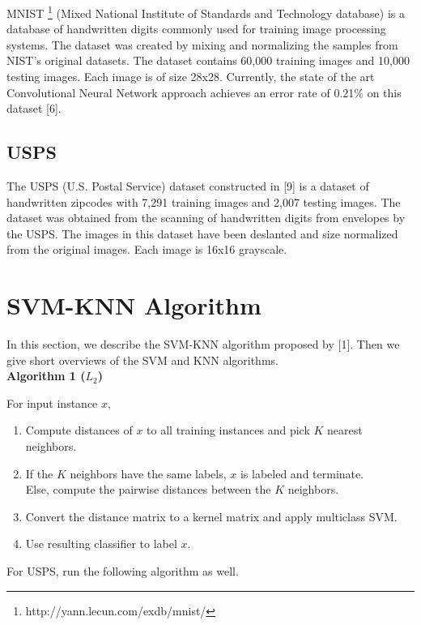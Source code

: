 \documentclass[11pt,letterpaper]{article}
\begin{document}
MNIST \footnote{http://yann.lecun.com/exdb/mnist/} (Mixed National Institute of Standards and Technology database) is a database of handwritten digits commonly used for training image processing systems. The dataset was created by mixing and normalizing the samples from NIST's original datasets. The dataset contains 60,000 training images and 10,000 testing images. Each image is of size 28x28. Currently, the state of the art Convolutional Neural Network approach achieves an error rate of 0.21$\%$ on this dataset [6].

\subsection{USPS}

The USPS (U.S. Postal Service) dataset constructed in [9] is a dataset of handwritten zipcodes with 7,291 training images and 2,007 testing images. The dataset was obtained from the scanning of handwritten digits from envelopes by the USPS. The images in this dataset have been deslanted and size normalized from the original images. Each image is 16x16 grayscale.

\section{SVM-KNN Algorithm}

In this section, we describe the SVM-KNN algorithm proposed by [1]. Then we give short overviews of the SVM and KNN algorithms.\\

\textbf{Algorithm 1 ($L_2$)}

For input instance $x$,
\begin{enumerate}[(1)]
\item Compute distances of $x$ to all training instances and pick $K$ nearest neighbors.
\item If the $K$ neighbors have the same labels, $x$ is labeled and terminate.\\
\qquad Else, compute the pairwise distances between the $K$ neighbors.
\item Convert the distance matrix to a kernel matrix and apply multiclass SVM.
\item Use resulting classifier to label $x$.\\
\end{enumerate}

For USPS, run the following algorithm as well.\\
\end{document}
